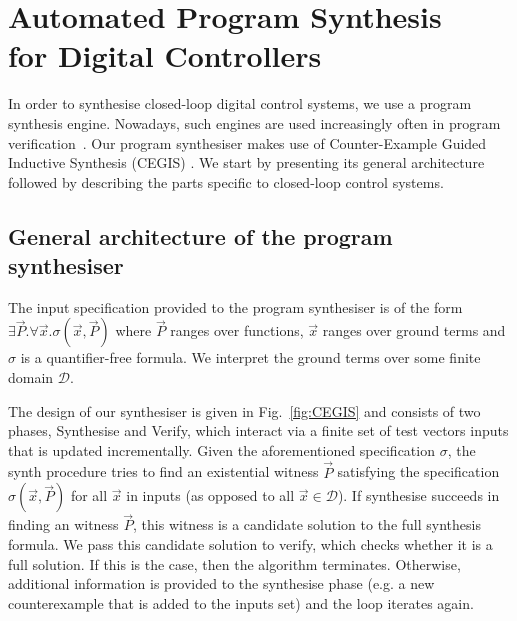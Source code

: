 \documentclass{sig-alternate-05-2015}
\newcommand{\red}[1]{{\color{red}#1}}
\begin{document}


\section{Automated Program Synthesis \\ for Digital Controllers}


In order to synthesise closed-loop digital control systems, we use a
program synthesis engine.  Nowadays, such engines are used
increasingly often in program
verification~\cite{DBLP:conf/lpar/DavidKL15,DBLP:conf/cav/0001A14}.
Our program synthesiser makes use of Counter-Example Guided Inductive
Synthesis (CEGIS) \cite{sketch}.  We start by presenting its general
architecture followed by describing the parts specific to closed-loop
control systems.


\subsection{General architecture of the program synthesiser}
%
% 
The input specification provided to the program synthesiser is of the
form $\exists \vec{P} . \forall \vec{x}. \sigma(\vec{x}, \vec{P})$ where $\vec{P}$ ranges over functions,
$\vec{x}$ ranges over ground terms and $\sigma$ is a quantifier-free
formula.  We interpret the ground terms over some finite domain
$\mathcal{D}$.

The design of our synthesiser is given in Fig.~\ref{fig:CEGIS} and
consists of two phases, {\sc Synthesise} and {\sc Verify}, which
interact via a finite set of test vectors {\sc inputs} that is updated
incrementally.  Given the aforementioned specification $\sigma$, the
{\sc synth} procedure tries to find an existential witness $\vec{P}$
satisfying the specification $\sigma(\vec{x}, \vec{P})$ for all
$\vec{x}$ in {\sc inputs} (as opposed to all $\vec{x} \in \mathcal{D}$).
%
If {\sc synthesise} succeeds in finding an witness $\vec{P}$, this
witness is a candidate solution to the full synthesis formula. 
We pass this candidate solution to {\sc verify}, which 
checks whether it is a full solution.
%
If this is the case, then
the algorithm terminates.
Otherwise, additional information is provided to the {\sc synthesise}
phase (e.g. a new counterexample that is added to the {\sc inputs} set)
and the loop iterates again.
\end{document}
